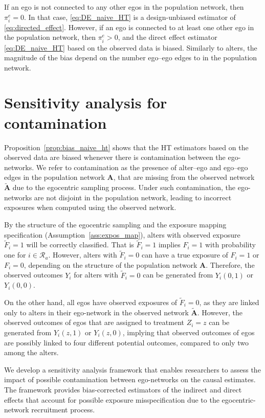 \documentclass[11pt]{article}
\theoremstyle{definition}
\def \bA {\boldsymbol{A}}
\def \cR {\mathcal{R}}
\begin{document}
If an ego is not connected to any other egos in the population network, then $\pi_i^e=0$.
In that case, \eqref{eq:DE_naive_HT} is a design-unbiased estimator of \eqref{eq:directed_effect}.
However, if an ego is connected to at least one other ego in the population network, then $\pi_i^e>0$,
and the direct effect estimator \eqref{eq:DE_naive_HT} based on the observed data is biased.
Similarly to alters, the magnitude of the bias depend on the number ego--ego edges to in the population network.
 
\section{Sensitivity analysis for contamination}
\label{sec:sa}

Proposition~\ref{prop:bias_naive_ht} shows that the HT estimators based on the observed data 
    are biased whenever there is contamination between the ego-networks.
We refer to contamination as the presence of alter--ego and ego--ego edges in the population network $\bA$,
that are missing from the observed network $\widetilde{\bA}$ due to the egocentric sampling process. 
Under such contamination, the ego-networks are not disjoint in the population network,
 leading to incorrect exposures when computed using the observed network.  
    
By the structure of the egocentric sampling and the
 exposure mapping specification (Assumption~\ref{ass:expos_map}),
alters with observed exposure $\widetilde{F}_i=1$ will be correctly classified. 
That is $\widetilde{F}_i=1$ implies $F_i=1$ with probability one for $i \in \cR_a$.
However, alters with $\widetilde{F}_i=0$ can have a true exposure of $F_i=1$ or $F_i=0$,
depending on the structure of the population network $\bA$.
Therefore, the observed outcomes $Y_i$ for alters with $\widetilde{F}_i=0$ can be generated from $Y_i(0,1)$ or $Y_i(0,0)$.

On the other hand, all egos have observed exposures of $\widetilde{F}_i=0$, 
as they are linked only to alters in their ego-network in the observed network $\widetilde{\bA}$.
However, the observed outcomes of egos that are assigned to
 treatment $Z_i=z$ can be generated from $Y_i(z,1)$ or $Y_i(z,0)$,
 implying that observed outcomes of egos are possibly linked to four different potential outcomes,
  compared to only two among the alters.

We develop a sensitivity analysis framework that enables researchers to assess the impact of
 possible contamination between ego-networks on the causal estimates.
The framework provides bias-corrected estimators of the indirect and direct effects 
that account for possible exposure misspecification due to the egocentric-network recruitment process. 
\end{document}
